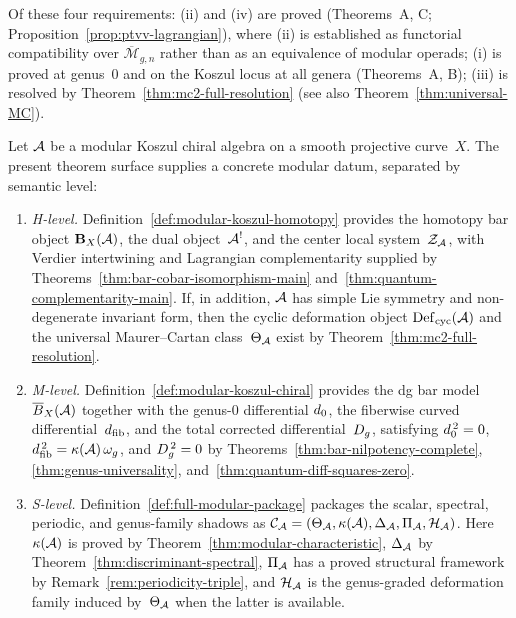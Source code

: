 \noindent
Of these four requirements: (ii) and (iv) are proved
(Theorems~A, C; Proposition~\ref{prop:ptvv-lagrangian}),
where (ii) is established as functorial compatibility over
$\overline{\mathcal{M}}_{g,n}$ rather than as an equivalence of
modular operads;
(i) is proved at genus~$0$ and on the Koszul locus at all genera
(Theorems~A, B); (iii) is resolved by
Theorem~\ref{thm:mc2-full-resolution}
(see also Theorem~\ref{thm:universal-MC}).

\begin{theorem}
\label{thm:volume-one-concrete-modular-datum}
Let $\mathcal{A}$ be a modular Koszul chiral algebra on a smooth projective
curve~$X$.  The present theorem surface supplies a concrete modular
datum, separated by semantic level:
\begin{enumerate}[label=\textup{(\roman*)}]
\item \emph{H-level.}
  Definition~\ref{def:modular-koszul-homotopy} provides the
  homotopy bar object $\mathbf{B}_X(\mathcal{A})$, the dual object~$\mathcal{A}^!$,
  and the center local system~$\mathcal{Z}_{\mathcal{A}}$, with Verdier
  intertwining and Lagrangian complementarity supplied by
  Theorems~\ref{thm:bar-cobar-isomorphism-main}
  and~\ref{thm:quantum-complementarity-main}.  If, in addition,
  $\mathcal{A}$ has simple Lie symmetry and non-degenerate invariant form,
  then the cyclic deformation object $\operatorname{Def}_{\mathrm{cyc}}(\mathcal{A})$ and the
  universal Maurer--Cartan class~$\Theta_{\mathcal{A}}$ exist by
  Theorem~\ref{thm:mc2-full-resolution}.
\item \emph{M-level.}
  Definition~\ref{def:modular-koszul-chiral} provides the dg bar
  model~$\overline{B}_X(\mathcal{A})$ together with the genus-$0$ differential
  $d_0$, the fiberwise curved differential~$d_{\mathrm{fib}}$, and the total
  corrected differential~$D_{g}$, satisfying
  $d_0^{\,2} = 0$,
  $d_{\mathrm{fib}}^{\,2} = \kappa(\mathcal{A})\,\omega_g$,
  and $D_{g}^{\,2} = 0$
  by Theorems~\ref{thm:bar-nilpotency-complete},
  \ref{thm:genus-universality},
  and~\ref{thm:quantum-diff-squares-zero}.
\item \emph{S-level.}
  Definition~\ref{def:full-modular-package} packages the scalar,
  spectral, periodic, and genus-family shadows as
  $\mathcal{C}_{\mathcal{A}}
  = (\Theta_{\mathcal{A}}, \kappa(\mathcal{A}), \Delta_{\mathcal{A}}, \Pi_{\mathcal{A}},
  \mathcal{H}_{\mathcal{A}})$.
  Here $\kappa(\mathcal{A})$ is proved by
  Theorem~\ref{thm:modular-characteristic},
  $\Delta_{\mathcal{A}}$ by
  Theorem~\ref{thm:discriminant-spectral},
  $\Pi_{\mathcal{A}}$ has a proved structural framework by
  Remark~\ref{rem:periodicity-triple},
  and $\mathcal{H}_{\mathcal{A}}$ is the genus-graded deformation family
  induced by~$\Theta_{\mathcal{A}}$ when the latter is available.
\end{enumerate}
\end{theorem}

